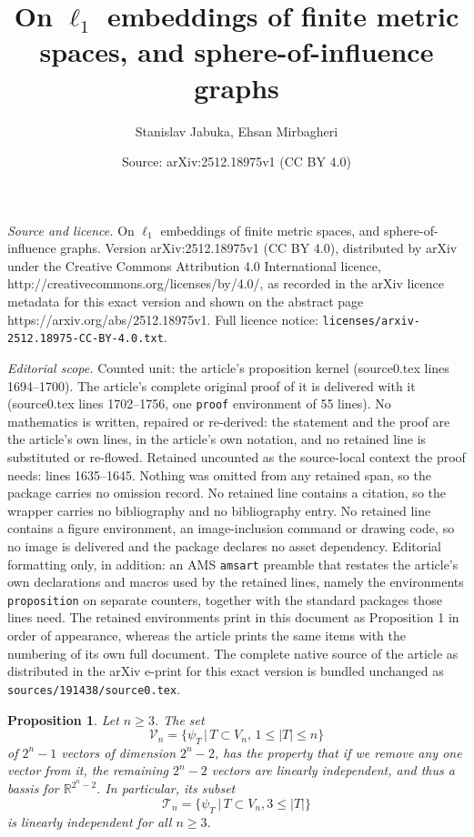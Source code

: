 \documentclass[10pt,a4paper]{amsart}
\title{On $\ell_1$ embeddings of finite metric spaces, and sphere-of-influence graphs}
\author{Stanislav Jabuka, Ehsan Mirbagheri}
\date{Source: arXiv:2512.18975v1 (CC BY 4.0)}
\newtheorem{proposition}{Proposition}
\begin{document}
\maketitle

\noindent\emph{Source and licence.} On $\ell_1$ embeddings of finite metric spaces, and sphere-of-influence graphs. Version arXiv:2512.18975v1 (CC BY 4.0), distributed by arXiv under the Creative Commons Attribution 4.0 International licence, http://creativecommons.org/licenses/by/4.0/, as recorded in the arXiv licence metadata for this exact version and shown on the abstract page https://arxiv.org/abs/2512.18975v1. Full licence notice: \texttt{licenses/arxiv-2512.18975-CC-BY-4.0.txt}.\par\smallskip

\noindent\textit{Editorial scope.} Counted unit: the article's proposition kernel (source0.tex lines 1694--1700). The article's complete original proof of it is delivered with it (source0.tex lines 1702--1756, one \texttt{proof} environment of 55 lines). No mathematics is written, repaired or re-derived: the statement and the proof are the article's own lines, in the article's own notation, and no retained line is substituted or re-flowed.  Retained uncounted as the source-local context the proof needs: lines 1635--1645.  Nothing was omitted from any retained span, so the package carries no omission record.  No retained line contains a citation, so the wrapper carries no bibliography and no bibliography entry.  No retained line contains a figure environment, an image-inclusion command or drawing code, so no image is delivered and the package declares no asset dependency.  Editorial formatting only, in addition: an AMS \texttt{amsart} preamble that restates the article's own declarations and macros used by the retained lines, namely the environments \texttt{proposition} on separate counters, together with the standard packages those lines need.  The retained environments print in this document as Proposition 1 in order of appearance, whereas the article prints the same items with the numbering of its own full document.  The complete native source of the article as distributed in the arXiv e-print for this exact version is bundled unchanged as \texttt{sources/191438/source0.tex}.
\begin{proposition} \label{Proposition showing linear independence of alternating sum vectors}
Let $n\ge 3$. The set 
$$\mathcal V_n = \{\psi_T\,|\, T\subset V_n, \, 1\le |T|\le n\}$$
of $2^n-1$ vectors of dimension $2^n-2$, has the property that if we remove any one vector from it, the remaining $2^n-2$ vectors are linearly independent, and thus a bassis for $\mathbb R^{2^n-2}$. In particular, its subset 
$$\mathcal T_n = \{\psi_T\,|\, T\subset V_n, 3\le|T|\}$$
is linearly independent for all $n\ge 3$. 
\end{proposition}
\end{document}
